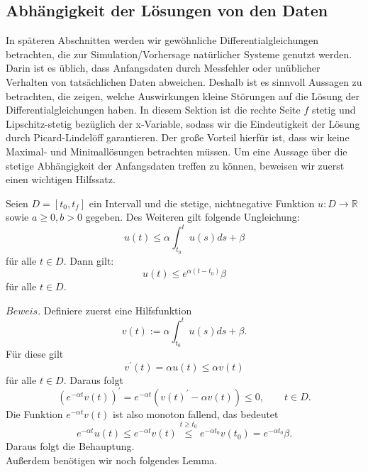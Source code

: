 \subsection{Abhängigkeit der Lösungen von den Daten}
In späteren Abschnitten werden wir gewöhnliche Differentialgleichungen betrachten, die zur Simulation/Vorhersage
natürlicher Systeme genutzt werden. Darin ist es üblich, dass Anfangsdaten durch Messfehler oder unüblicher Verhalten
von tatsächlichen Daten abweichen. Deshalb ist es sinnvoll Aussagen zu betrachten, die zeigen, welche Auswirkungen
kleine Störungen auf die Lösung der Differentialgleichungen haben. In diesem Sektion ist die rechte Seite $f$ stetig und
Lipschitz-stetig bezüglich der x-Variable, sodass wir die Eindeutigkeit der Lösung durch Picard-Lindelöff garantieren.
Der große Vorteil hierfür ist, dass wir keine Maximal- und Minimallösungen betrachten müssen.
Um eine Aussage über die stetige Abhängigkeit der Anfangsdaten treffen zu können, beweisen wir zuerst einen wichtigen
Hilfssatz.
\begin{theorem}
    \label{Satz-gronwall}
    Seien $D=[t_{0}, t_{f}]$ ein Intervall und die stetige, nichtnegative Funktion $u : D \rightarrow \mathbb{R}$
    sowie $a \geq 0, b > 0$ gegeben. Des Weiteren gilt folgende Ungleichung:
    \[
        u(t) \leq \alpha \int_{t_{0}}^{t}u(s)ds + \beta
    \]
    für alle $t \in D$. Dann gilt:
    \[
        u(t) \leq e^{\alpha(t-t_{0})}\beta
    \]
    für alle $t \in D$.
\end{theorem}
$Beweis.$ Definiere zuerst eine Hilfsfunktion
\[
    v(t) := \alpha \int_{t_{0}}^{t} u(s)ds + \beta.
\] Für diese gilt
\[
    v^\prime(t) = \alpha u(t) \leq \alpha v(t)
\] für alle $t \in D$. Daraus folgt
\[
    (e^{-\alpha t}v(t))^\prime = e^{-\alpha t}(v(t)^\prime-\alpha v(t)) \leq 0, \qquad t \in D.
\]
Die Funktion $e^{-\alpha t} v(t)$ ist also monoton fallend, das bedeutet
\[
    e^{-\alpha t} u(t) \leq e^{-\alpha t} v(t) \stackrel{t \geq t_{0}}{\leq} e^{-\alpha t_{0}} v(t_{0}) = e^{-\alpha t_{0}}\beta.
\] Daraus folgt die Behauptung. \qedwhite \\
Außerdem benötigen wir noch folgendes Lemma.
